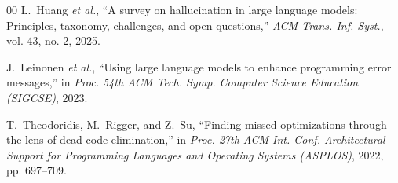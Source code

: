 \documentclass[conference]{IEEEtran}
\begin{document}
\begin{thebibliography}{00}
L.~Huang \emph{et al.}, ``A survey on hallucination in large language models:
Principles, taxonomy, challenges, and open questions,'' \emph{ACM Trans. Inf.
Syst.}, vol. 43, no. 2, 2025.

J.~Leinonen \emph{et al.}, ``Using large language models to enhance programming
error messages,'' in \emph{Proc. 54th ACM Tech. Symp. Computer Science
Education (SIGCSE)}, 2023.

T.~Theodoridis, M.~Rigger, and Z.~Su, ``Finding missed optimizations through
the lens of dead code elimination,'' in \emph{Proc. 27th ACM Int. Conf.
Architectural Support for Programming Languages and Operating Systems
(ASPLOS)}, 2022, pp. 697--709.

\end{thebibliography}
\end{document}
